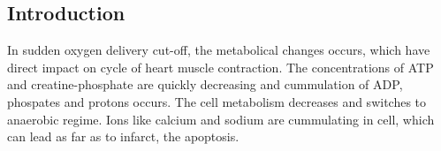 \documentclass[a0,portrait]{a0poster}
\begin{document}
\vspace{2cm} %


\begin{multicols}{2} %

%
%
%
%


\color{SaddleBrown} %

\section*{Introduction}

In sudden oxygen delivery cut-off, the metabolical changes occurs, which
have direct impact on cycle of heart muscle contraction. The
concentrations of ATP and creatine-phosphate are quickly decreasing and
cummulation of ADP, phospates and protons occurs. The cell metabolism
decreases and switches to anaerobic regime. Ions like calcium and sodium
are cummulating in cell, which can lead as far as to infarct, the
apoptosis. 


\end{multicols}
\end{document}
